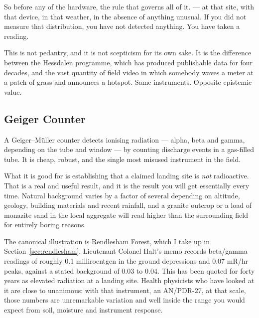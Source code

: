 
So before any of the hardware, the rule that governs all of it.  --- at that site, with that device, in that
weather, in the absence of anything unusual. If you did not measure that distribution, you have
not detected anything. You have taken a reading.

This is not pedantry, and it is not scepticism for its own sake. It is the difference between
the Hessdalen programme, which has produced publishable data for four decades, and the vast
quantity of field video in which somebody waves a meter at a patch of grass and announces a
hotspot. Same instruments. Opposite epistemic value.

\Needspace*{0.40\textheight}
\subsection{Geiger Counter}

A Geiger--M\"uller counter detects ionising radiation --- alpha, beta and gamma, depending on
the tube and window --- by counting discharge events in a gas-filled tube. It is cheap, robust,
and the single most misused instrument in the field.

What it is good for is establishing that a claimed landing site is \emph{not} radioactive. That
is a real and useful result, and it is the result you will get essentially every time. Natural
background varies by a factor of several depending on altitude, geology, building materials and
recent rainfall, and a granite outcrop or a load of monazite sand in the local aggregate will
read higher than the surrounding field for entirely boring reasons.

The canonical illustration is Rendlesham Forest, which I take up in
Section~\ref{sec:rendlesham}. Lieutenant Colonel Halt's memo records beta/gamma readings of
roughly 0.1 milliroentgen in the ground depressions and 0.07 mR/hr peaks, against a stated
background of 0.03 to 0.04. This has been quoted for forty years as elevated radiation at a
landing site. Health physicists who have looked at it are close to unanimous: with that
instrument, an AN/PDR-27, at that scale, those numbers are unremarkable variation and well
inside the range you would expect from soil, moisture and instrument response.

